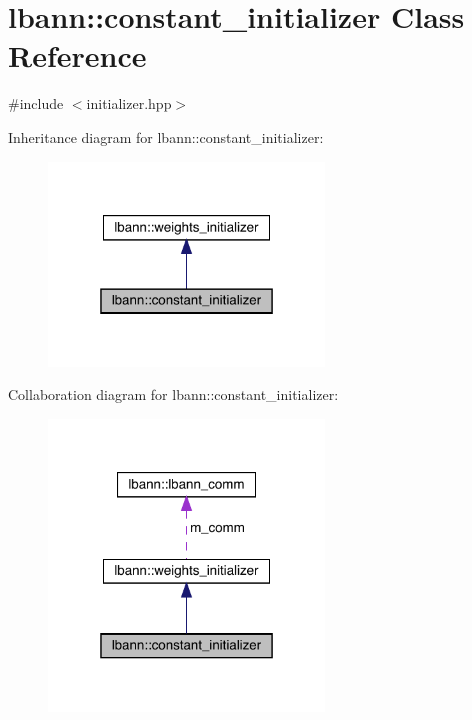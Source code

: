 \hypertarget{classlbann_1_1constant__initializer}{}\section{lbann\+:\+:constant\+\_\+initializer Class Reference}
\label{classlbann_1_1constant__initializer}


{\ttfamily \#include $<$initializer.\+hpp$>$}



Inheritance diagram for lbann\+:\+:constant\+\_\+initializer\+:\nopagebreak
\begin{figure}[H]
\begin{center}
\leavevmode
\includegraphics[width=208pt]{classlbann_1_1constant__initializer__inherit__graph}
\end{center}
\end{figure}


Collaboration diagram for lbann\+:\+:constant\+\_\+initializer\+:\nopagebreak
\begin{figure}[H]
\begin{center}
\leavevmode
\includegraphics[width=208pt]{classlbann_1_1constant__initializer__coll__graph}
\end{center}
\end{figure}
